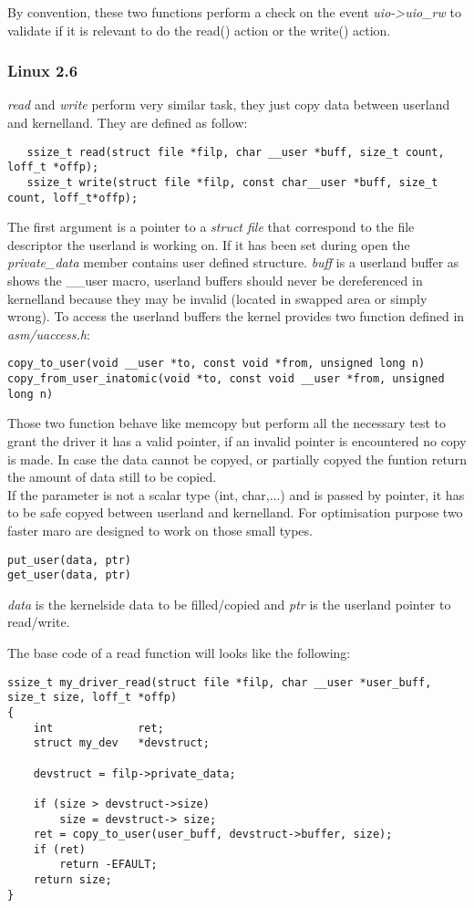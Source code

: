 \documentclass[11pt]{report}
\begin{document}
By convention, these two functions perform a check on the event {\it uio-\textgreater uio\_rw} to
validate if it is relevant to do the read() action or the write() action.

\subsubsection{Linux 2.6}

 {\it read} and  {\it write} perform very similar task, they just copy data
 between userland and kernelland. They are defined as follow:
 \begin{lstlisting}
   ssize_t read(struct file *filp, char __user *buff, size_t count, loff_t *offp);
   ssize_t write(struct file *filp, const char__user *buff, size_t count, loff_t*offp);
 \end{lstlisting}
The first argument is a pointer to a  {\it struct file} that correspond to the
file descriptor the userland is working on. If it has been set during open
the {\it private\_data} member contains user defined structure.
{\it buff} is a userland buffer as shows the \_\_user macro, userland buffers
should never be dereferenced in kernelland because they may be invalid (located
in swapped area or simply wrong). To access the userland buffers the kernel
provides two function defined in {\it asm/uaccess.h}:
\begin{lstlisting}
copy_to_user(void __user *to, const void *from, unsigned long n)
copy_from_user_inatomic(void *to, const void __user *from, unsigned long n)
\end{lstlisting}
Those two function behave like memcopy but perform all the necessary test to
grant the driver it has a valid pointer, if an invalid pointer is encountered
no copy is made. 
In case the data cannot be copyed, or partially copyed the funtion return the
amount of data still to be copied.\\
If the parameter is not a scalar type (int, char,...) and is passed by pointer,
it has to be safe copyed between userland and kernelland. For optimisation
purpose two faster maro are designed to work on those small types.
\begin{lstlisting}
put_user(data, ptr)
get_user(data, ptr)
\end{lstlisting}
 {\it data} is the kernelside data to be filled/copied and  {\it ptr} is the
 userland pointer to read/write.

The base code of a read function will looks like the following:
\begin{lstlisting}
ssize_t my_driver_read(struct file *filp, char __user *user_buff, size_t size, loff_t *offp)
{
    int             ret;
    struct my_dev   *devstruct;
    
    devstruct = filp->private_data;

    if (size > devstruct->size)
        size = devstruct-> size;
    ret = copy_to_user(user_buff, devstruct->buffer, size);
    if (ret)
        return -EFAULT;
    return size;
}
\end{lstlisting}
\end{document}
